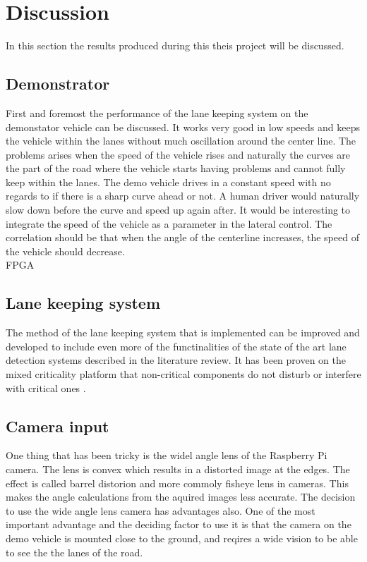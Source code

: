 \chapter{Discussion}
In this section the results produced during this theis project will be discussed.
\section{Demonstrator}
First and foremost the performance of the lane keeping system on the demonstator vehicle can be discussed. It works very good in low speeds and keeps the vehicle within the lanes without much oscillation around the center line. The problems arises when the speed of the vehicle rises and naturally the curves are the part of the road where the vehicle starts having problems and cannot fully keep within the lanes. The demo vehicle drives in a constant speed with no regards to if there is a sharp curve ahead or not. A human driver would naturally slow down before the curve and speed up again after. It would be interesting to integrate the speed of the vehicle as a parameter in the lateral control. The correlation should be that when the angle of the centerline increases, the speed of the vehicle should decrease. \\


FPGA\\

\section{Lane keeping system}
The method of the lane keeping system that is implemented can be improved and developed to include even more of the functinalities of the state of the art lane detection systems described in the literature review. It has been proven on the mixed criticality platform that non-critical components do not disturb or interfere with critical ones \cite{zaki2016}.\\

\section{Camera input}
One thing that has been tricky is the widel angle lens of the Raspberry Pi camera. The lens is convex which results in a distorted image at the edges. The effect is called barrel distorion and more commoly fisheye lens in cameras. This makes the angle calculations from the aquired images less accurate. The decision to use the wide angle lens camera has advantages also. One of the most important advantage and the deciding factor to use it is that the camera on the demo vehicle is mounted close to the ground, and reqires a wide vision to be able to see the the lanes of the road.\\

